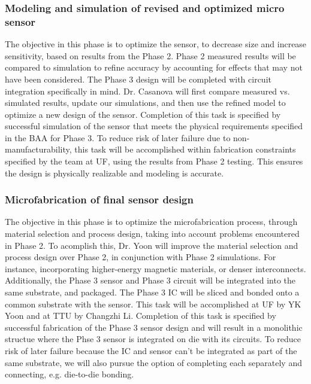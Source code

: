 \subsubsection{Modeling and simulation of revised and optimized micro sensor}\label{sec:p3:em}

The objective in this phase is to optimize the sensor, to decrease size and increase sensitivity, based on results from the Phase 2. Phase 2 measured results will be compared to simulation to refine accuracy by accounting for effects that may not have been considered. The Phase 3 design will be completed with circuit integration specifically in mind. Dr. Casanova will first compare measured vs. simulated results, update our simulations, and then use the refined model to optimize a new design of the sensor. Completion of this task is specified by successful simulation of the sensor that meets the physical requirements specified in the BAA for Phase 3. To reduce risk of later failure due to non-manufacturability, this task will be accomplished within fabrication constraints specified by the team at UF, using the results from Phase 2 testing. This ensures the design is physically realizable and modeling is accurate.

\subsubsection{Microfabrication of final sensor design}\label{sec:p3:mf}

The objective in this phase is to optimize the microfabrication process, through material selection and process design, taking into account problems encountered in Phase 2. To acomplish this, Dr. Yoon will improve the material selection and process design over Phase 2, in conjunction with Phase 2 simulations. For instance, incorporating higher-energy magnetic materials, or denser interconnects. Additionally, the Phase 3 sensor and Phase 3 circuit will be integrated into the same substrate, and packaged. The Phase 3 IC will be sliced and bonded onto a common substrate with the sensor.  This task will be accomplished at UF by YK Yoon and at TTU by Changzhi Li. Completion of this task is specified by successful fabrication of the Phase 3 sensor design and will result in a monolithic structue where the Phse 3 sensor is integrated on die with its circuits. To reduce risk of later failure because the IC and sensor can't be integrated as part of the same substrate, we will also pursue the option of completing each separately and connecting, e.g. die-to-die bonding.

